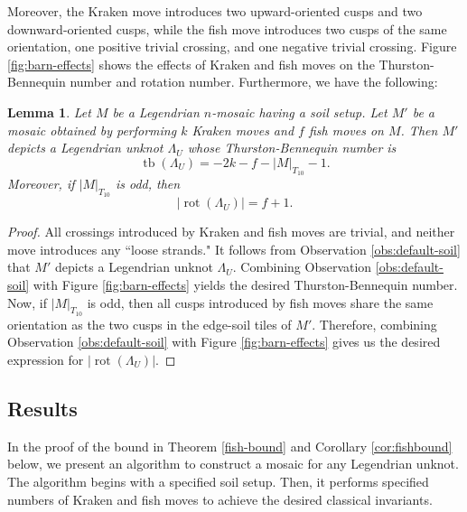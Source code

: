 \documentclass{article}
\DeclareMathOperator{\tb}{tb}
\DeclareMathOperator{\rot}{rot}
\newtheorem{lemma}{Lemma}
\begin{document}

Moreover, the Kraken move introduces two upward-oriented cusps and two downward-oriented cusps, while the fish move introduces two cusps of the same orientation, one positive trivial crossing, and one negative trivial crossing.  Figure \ref{fig:barn-effects} shows the effects of Kraken and fish moves on the Thurston-Bennequin number and rotation number. Furthermore, we have the following:
\begin{lemma} \label{barn-lemma}
    Let $M$ be a Legendrian $n$-mosaic having a soil setup. Let $M'$ be a mosaic obtained by performing $k$ Kraken moves and $f$ fish moves on $M$. Then $M'$ depicts a Legendrian unknot $\Lambda_U$ whose Thurston-Bennequin number is
    \[
    \tb(\Lambda_U) = -2k-f-|M|_{T_{10}}-1.
    \]
    Moreover, if $|M|_{T_{10}}$ is odd, then
    \[
    |\rot(\Lambda_U)| = f+1.
    \]
\end{lemma}

\begin{proof}
    All crossings introduced by Kraken and fish moves are trivial, and neither move introduces any ``loose strands." It follows from Observation \ref{obs:default-soil} that $M'$ depicts a Legendrian unknot $\Lambda_U$. Combining Observation \ref{obs:default-soil} with Figure \ref{fig:barn-effects} yields the desired Thurston-Bennequin number. Now, if $|M|_{T_{10}}$ is odd, then all cusps introduced by fish moves share the same orientation as the two cusps in the edge-soil tiles of $M'$. Therefore, combining Observation \ref{obs:default-soil} with Figure \ref{fig:barn-effects} gives us the desired expression for $|\rot(\Lambda_U)|$.
\end{proof}

\subsection{Results}

In the proof of the bound in Theorem \ref{fish-bound} and Corollary \ref{cor:fishbound} below, we present an algorithm to construct a mosaic for any Legendrian unknot. The algorithm begins with a specified soil setup. Then, it performs specified numbers of Kraken and fish moves to achieve the desired classical invariants.
\end{document}
